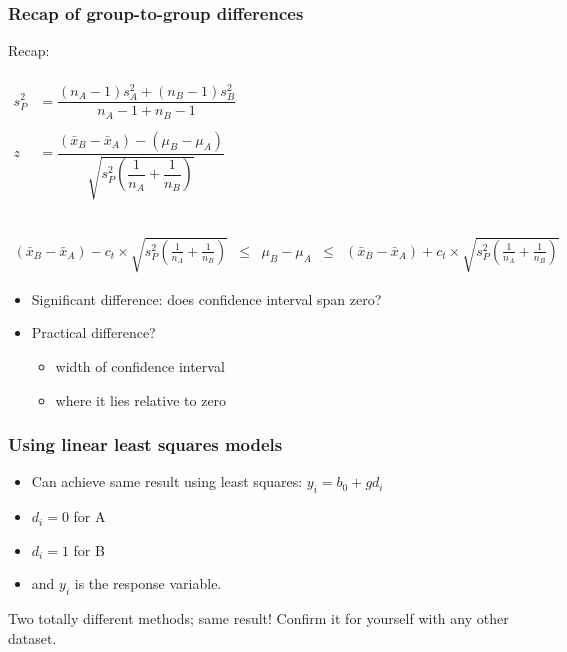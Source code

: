 \begin{frame}\frametitle{Recap of group-to-group differences}

	Recap:

	$
	\begin{array}{rcl}
		\\
		s_P^2 &= \dfrac{(n_A -1) s_A^2 + (n_B-1)s_B^2}{n_A - 1 + n_B - 1} \\
		& \\
		z &= \dfrac{(\bar{x}_B - \bar{x}_A) - (\mu_B - \mu_A)}{\sqrt{s_P^2 \left(\dfrac{1}{n_A} + \dfrac{1}{n_B}\right)}}\\
		\\
	\end{array}
	$

	$
	\begin{array}{rcccl}
		\\
		{\scriptstyle (\bar{x}_B - \bar{x}_A) - c_t} \times \sqrt{\scriptstyle s_P^2 \left(\frac{1}{n_A} + \frac{1}{n_B}\right)} &\leq& {\scriptstyle \mu_B - \mu_A} &\leq & {\scriptstyle (\bar{x}_B - \bar{x}_A) + c_t } \times \sqrt{\scriptstyle s_P^2 \left(\frac{1}{n_A} + \frac{1}{n_B}\right)}
	\end{array}
	$
	\begin{itemize}
		\item	Significant difference: does confidence interval span zero?
		\item	Practical difference?
		\begin{itemize}
			\item	width of confidence interval
			\item	where it lies relative to zero
		\end{itemize}
	\end{itemize}
\end{frame}

\begin{frame}\frametitle{Using linear least squares models}
	\begin{itemize}
		\item	Can achieve same result using least squares: $y_i = b_0 + g d_i$
		\item	$d_i = 0$ for A
		\item	$d_i=1$ for B
		\item	and $y_i$ is the response variable.
	\end{itemize}
	
	\vspace{12pt}
	{\color{myOrange}{See question in this week's assignment.}}
	
	\vspace{12pt}
	Two totally different methods; same result! Confirm it for yourself with any other dataset.
\end{frame}

